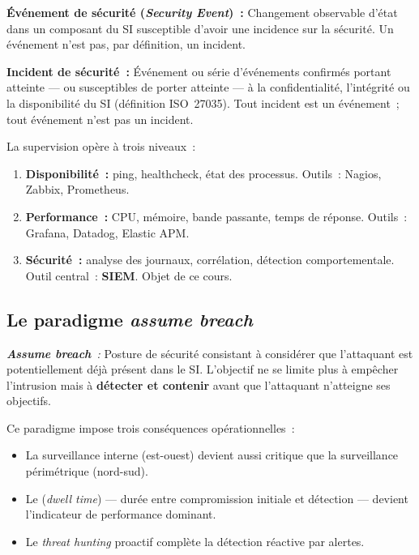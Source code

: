 \begin{boxdef}
\textbf{Événement de sécurité (\textit{Security Event})~:} Changement observable
d'état dans un composant du SI susceptible d'avoir une incidence sur la sécurité.
Un événement n'est pas, par définition, un incident.
\end{boxdef}

\begin{boxdef}
\textbf{Incident de sécurité~:} Événement ou série d'événements confirmés portant
atteinte — ou susceptibles de porter atteinte — à la confidentialité, l'intégrité ou
la disponibilité du SI (définition ISO~27035). Tout incident est un événement~;
tout événement n'est pas un incident.
\end{boxdef}

La supervision opère à trois niveaux~:

\begin{enumerate}
  \item \textbf{Disponibilité~:} ping, healthcheck, état des processus.
        Outils~: Nagios, Zabbix, Prometheus.
  \item \textbf{Performance~:} CPU, mémoire, bande passante, temps de réponse.
        Outils~: Grafana, Datadog, Elastic APM.
  \item \textbf{Sécurité~:} analyse des journaux, corrélation, détection
        comportementale. Outil central~: \textbf{SIEM}. Objet de ce cours.
\end{enumerate}

\subsection{Le paradigme \textit{assume breach}}

\begin{boxdef}
\textit{\textbf{Assume breach}~:} Posture de sécurité consistant à considérer
que l'attaquant est potentiellement déjà présent dans le SI. L'objectif ne
se limite plus à empêcher l'intrusion mais à \textbf{détecter et contenir}
avant que l'attaquant n'atteigne ses objectifs.
\end{boxdef}

Ce paradigme impose trois conséquences opérationnelles~:
\begin{itemize}
  \item La surveillance interne (est-ouest) devient aussi critique que
        la surveillance périmétrique (nord-sud).
  \item Le  (\textit{dwell time}) — durée entre
        compromission initiale et détection — devient l'indicateur de
        performance dominant.
  \item Le \textit{threat hunting} proactif complète la détection réactive
        par alertes.
\end{itemize}

